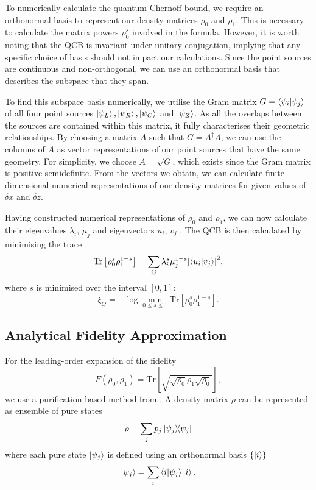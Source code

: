 \documentclass[reprint,amsmath,amssymb,aps,prl,floatfix,groupedaddress,superscriptaddress]{revtex4-2}
\begin{document}
To numerically calculate the quantum Chernoff bound, we require an orthonormal basis to represent our density matrices $\rho_0$ and $\rho_1$. This is necessary to calculate the matrix powers $\rho_0^s$ involved in the formula. However, it is worth noting that the QCB is invariant under unitary conjugation, implying that any specific choice of basis should not impact our calculations. Since the point sources are continuous and non-orthogonal, we can use an orthonormal basis that describes the subspace that they span.

To find this subspace basis numerically, we utilise the Gram matrix $G = \braket{\psi_i}{\psi_j}$ of all four point sources $\ket{\psi_L}, \ket{\psi_R}, \ket{\psi_C}$ and $\ket{\psi_Z}$. As all the overlaps between the sources are contained within this matrix, it fully characterises their geometric relationships. By choosing a matrix $A$ such that $G=A^\dagger A$, we can use the columns of $A$ as vector representations of our point sources that have the same geometry. For simplicity, we choose $A = \sqrt{G}$, which exists since the Gram matrix is positive semidefinite. From the vectors we obtain, we can calculate finite dimensional numerical representations of our density matrices for given values of $\delta x$ and $\delta z$.

Having constructed numerical representations of $\rho_0$ and $\rho_1$, we can now calculate their eigenvalues $\lambda_i$, $\mu_j$ and eigenvectors $u_i$, $v_j$ \cite{audenaert2007discriminating}. The QCB is then calculated by minimising the trace
\begin{equation}
    \text{Tr}\left[\rho_0^s \rho_1^{1-s} \right] = \sum_{ij} \lambda_i^s \mu_j^{1-s} \abs{\braket{u_i}{v_j}}^2,
\end{equation}
where $s$ is minimised over the interval $[0,1]$:
\begin{equation}
\xi_Q = -\log \min_{0 \leq s \leq 1} \text{Tr} \left[ \rho_0^s \rho_1^{1-s} \right].
\end{equation}

\subsection{Analytical Fidelity Approximation} \label{app:fidelity_approximation}

For the leading-order expansion of the fidelity
\begin{equation}
F(\rho_0, \rho_1) = \text{Tr}\left[ \sqrt{\sqrt{\rho_0} \rho_1 \sqrt{\rho_0}}\right],
\end{equation}
we use a purification-based method from  \cite{lupo2020quantum}. A density matrix $\rho$ can be represented as ensemble of pure states
\begin{equation}
    \rho = \sum_j p_j \ketbra{\psi_j}{\psi_j}
\end{equation}
where each pure state $\ket{\psi_j}$ is defined using an orthonormal basis $\{\ket{i}\}$
\begin{equation}
\ket{\psi_j} = \sum_i \braket{i}{\psi_j} \ket{i}.
\end{equation}
\end{document}
